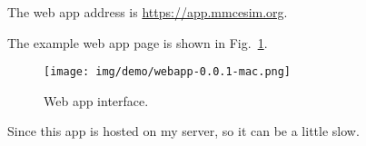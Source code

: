 The web app address is \url{https://app.mmcesim.org}.

The example web app page is shown in Fig.~\ref{d:fig:web_app_demo}.
\begin{figure}[htbp]
  \centering
  \texttt{[image: img/demo/webapp-0.0.1-mac.png]}
  \caption{Web app interface.}
  \label{d:fig:web_app_demo}
\end{figure}

\begin{tip}[Note]
  Since this app is hosted on my server, so it can be a little slow.
\end{tip}
